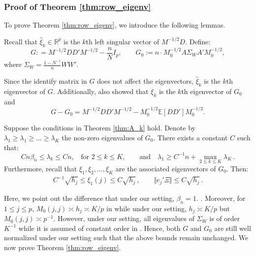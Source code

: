 \documentclass[preprint,11pt]{article}
\numberwithin{equation}{section}
\begin{document}
\subsubsection{Proof of Theorem \ref{thm:row_eigenv}}
To prove Theorem \ref{thm:row_eigenv}, we introduce the following lemmas. 

Recall that $\hat{\xi}_k\in\mathbb{R}^p$ is the $k$th left singular vector of $M^{-1/2}D$. Define:
\begin{equation*}
G : = M^{-1/2} DD' M^{-1/2} - \frac{n}{N} I_p, \qquad G_0:=  n\cdot M_0^{-1/2} A\Sigma_W A'M_0^{-1/2}, 
\end{equation*}
where $\Sigma_W = \frac{1-N^{-1}}{n}WW'$.

Since the identify matrix in $G$ does not affect the eigenvectors, $\hat{\xi}_k$ is the $k$th eigenvector of $G$. Additionally, \cite{ke2024entry} also showed that $\xi_k$ is the $k$th eigenvector of $G_0$ and 
\begin{equation*}
G - G_0 = M^{-1/2}DD'M^{-1/2}-M_0^{-1/2}\mathbb{E}[DD']M_0^{-1/2}. 
\end{equation*}

\begin{lemma}\label{lem:eigen}
Suppose the conditions in Theorem \ref{thm:A_k} hold. Denote by $\lambda_1\geq \lambda_1\geq \ldots \geq \lambda_K$ the non-zero eigenvalues of $G_0$. There exists a constant $C$ such that:
\[
Cn \beta_n \leq \lambda_k\leq C n, \;\; \text{ for $2\leq k\leq K$},\qquad \text{and} \quad \lambda_1 \geq C^{-1} n + \max_{2\leq k \leq K}\lambda_K\,. 
\]
Furthermore, recall that $\xi_1,\xi_2, \ldots, \xi_K $ are the associated eigenvectors of $G_0$. Then:
\begin{align*}
C^{-1} \sqrt{h_j} \leq \xi_1(j)\leq C \sqrt{h_j}\, , \qquad \Vert e_j'\Xi\Vert \leq C\sqrt{h_j} \, . 
\end{align*}
\end{lemma}
Here, we point out the difference that under our setting, $\beta_n = 1$.
. Moreover, for $1\le j\le p$, $M_0(j,j)\asymp h_j\asymp K/p$ in \cite{ke2024entry} while under our setting, $h_j\asymp K/p$ but $M_0(j,j)\asymp p^{-1}$. However, under our setting, all eigenvalues of $\Sigma_W$ is of order $K^{-1}$ while it is assumed of constant order in \cite{ke2024entry}. Hence, both $G$ and $G_0$ are still well normalized under our setting such that the above bounds remain unchanged. We now prove Theorem \ref{thm:row_eigenv}.
\end{document}
